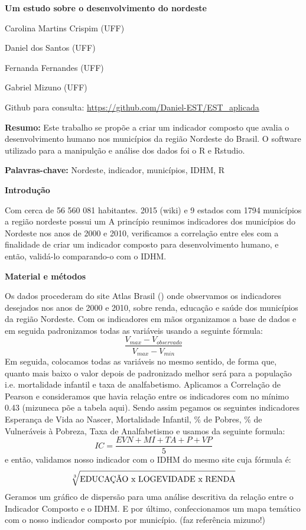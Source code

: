 \documentclass[11pt,a4paper]{article}
\begin{document}
\begin{center}
\Large{\textbf{Um estudo sobre o desenvolvimento do nordeste }}

\bigskip

\begin{singlespace}
\large{Carolina Martins Crispim (UFF)

Daniel dos Santos (UFF)

Fernanda Fernandes (UFF)

Gabriel Mizuno (UFF)} 

\bigskip

\small{Github para consulta: \url{https://github.com/Daniel-EST/EST_aplicada}}
\end{singlespace}
\end{center}


\textbf{Resumo:} Este trabalho se propõe a criar um indicador composto que avalia o desenvolvimento humano nos municípios da região Nordeste do Brasil. O software utilizado para a manipulção e análise dos dados foi o R e Rstudio.


\textbf{Palavras-chave:} Nordeste, indicador, municípios, IDHM, R


\textbf{Introdução}

Com cerca de 56 560 081 habitantes. 2015 (wiki) e 9 estados com 1794 municípios a região nordeste possui um
A princípio reunimos indicadores dos municípios do Nordeste nos anos de 2000 e 2010, verificamos a correlação entre eles com a finalidade de criar um indicador composto para desenvolvimento humano, e então, validá-lo comparando-o com o IDHM. 


\textbf{Material e métodos}

Os dados procederam do site Atlas Brasil (\cite{atlas}) onde observamos os indicadores desejados nos anos de 2000 e 2010, sobre renda, educação e saúde dos municípios da região Nordeste. Com os indicadores em mãos organizamos a base de dados e em seguida padronizamos todas as variáveis usando a seguinte fórmula: $$\frac{V_{max}-V_{observado}}{V_{max} - V_{min}} $$ Em seguida, colocamos todas as variáveis no mesmo sentido, de forma que, quanto mais baixo o valor depois de padronizado melhor será para a população i.e. mortalidade infantil e taxa de analfabetismo. Aplicamos a Correlação de Pearson e consideramos que havia relação entre os indicadores com no mínimo 0.43 (mizuneca põe a tabela aqui). Sendo assim pegamos os seguintes indicadores Esperança de Vida ao Nascer, Mortalidade Infantil,  \% de Pobres, \% de Vulneráveis à Pobreza, Taxa de Analfabetismo e usamos da seguinte formula: $$ IC = \frac{EVN+MI+TA+P+VP}{5} $$ e então, validamos nosso indicador com o IDHM do mesmo site cuja fórmula é: $$ \sqrt[3]{\hbox{EDUCAÇÃO x LOGEVIDADE x RENDA}}$$ Geramos um gráfico de dispersão para uma análise descritiva da relação entre o Indicador Composto e o IDHM. E por último, confeccionamos um mapa temático com o nosso indicador composto por município. (faz referência mizuno!)
\end{document}
